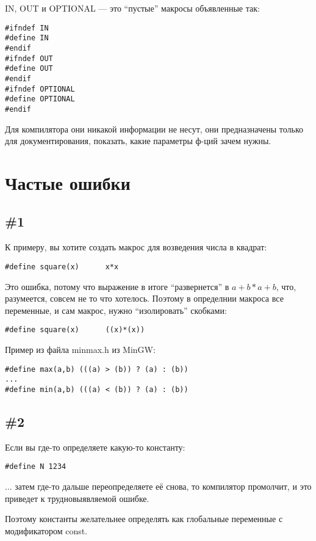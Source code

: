 IN, OUT и OPTIONAL --- это ``пустые'' макросы объявленные так:

\begin{lstlisting}
#ifndef IN
#define IN
#endif
#ifndef OUT
#define OUT
#endif
#ifndef OPTIONAL
#define OPTIONAL
#endif
\end{lstlisting}

Для компилятора они никакой информации не несут, они предназначены только для документирования, показать,
какие параметры ф-ций зачем нужны.

\section{Частые ошибки}

\subsection{\#1}

К примеру, вы хотите создать макрос для возведения числа в квадрат:

\begin{lstlisting}
#define square(x)      x*x
\end{lstlisting}

Это ошибка, потому что выражение  в итоге ``развернется'' в $a+b*a+b$, что, разумеется, совсем
не то что хотелось. Поэтому в определнии макроса все переменные, и сам макрос, нужно ``изолировать'' скобками:

\begin{lstlisting}
#define square(x)      ((x)*(x))
\end{lstlisting}

Пример из файла minmax.h из MinGW:

\begin{lstlisting}
#define max(a,b) (((a) > (b)) ? (a) : (b))
...
#define min(a,b) (((a) < (b)) ? (a) : (b))
\end{lstlisting}

\subsection{\#2}

Если вы где-то определяете какую-то константу:

\begin{lstlisting}
#define N 1234
\end{lstlisting}

... затем где-то дальше переопределяете её снова, то компилятор промолчит, и это приведет к трудновыявляемой
ошибке.

Поэтому константы желательнее определять как глобальные переменные с модификатором const.

